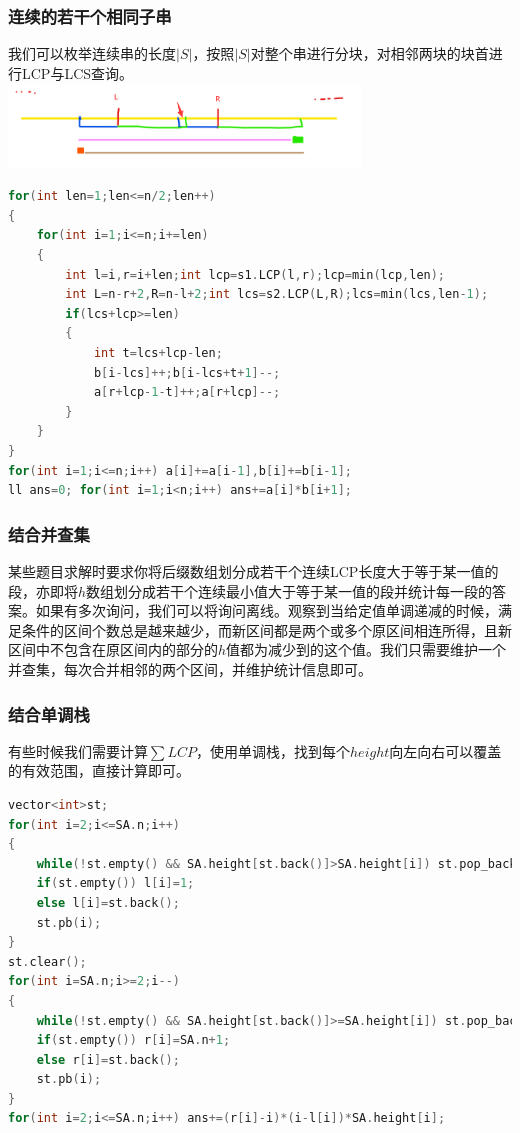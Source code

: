 \documentclass[a4paper]{book}
\begin{document}
\subsubsection{连续的若干个相同子串}
我们可以枚举连续串的长度$|S|$，按照$|S|$对整个串进行分块，对相邻两块的块首进行LCP与LCS查询。\\
\includegraphics[width=0.7\textwidth,center]{../photo/sa3}\\
\begin{lstlisting}[language=c++,title=字符串多少子串可写成AABB形式]
for(int len=1;len<=n/2;len++)
{
    for(int i=1;i<=n;i+=len)
    {
        int l=i,r=i+len;int lcp=s1.LCP(l,r);lcp=min(lcp,len);
        int L=n-r+2,R=n-l+2;int lcs=s2.LCP(L,R);lcs=min(lcs,len-1);
        if(lcs+lcp>=len)
        {
            int t=lcs+lcp-len;
            b[i-lcs]++;b[i-lcs+t+1]--;
            a[r+lcp-1-t]++;a[r+lcp]--;
        }
    }
}
for(int i=1;i<=n;i++) a[i]+=a[i-1],b[i]+=b[i-1];
ll ans=0; for(int i=1;i<n;i++) ans+=a[i]*b[i+1];
\end{lstlisting}
\subsubsection{结合并查集}
某些题目求解时要求你将后缀数组划分成若干个连续LCP长度大于等于某一值的段，亦即将$h$数组划分成若干个连续最小值大于等于某一值的段并统计每一段的答案。如果有多次询问，我们可以将询问离线。观察到当给定值单调递减的时候，满足条件的区间个数总是越来越少，而新区间都是两个或多个原区间相连所得，且新区间中不包含在原区间内的部分的$h$值都为减少到的这个值。我们只需要维护一个并查集，每次合并相邻的两个区间，并维护统计信息即可。
\subsubsection{结合单调栈}
有些时候我们需要计算$\sum LCP$，使用单调栈，找到每个$height$向左向右可以覆盖的有效范围，直接计算即可。
\begin{lstlisting}[language=c++]
vector<int>st;
for(int i=2;i<=SA.n;i++)
{
    while(!st.empty() && SA.height[st.back()]>SA.height[i]) st.pop_back();
    if(st.empty()) l[i]=1;
    else l[i]=st.back();
    st.pb(i);
}
st.clear();
for(int i=SA.n;i>=2;i--)
{
    while(!st.empty() && SA.height[st.back()]>=SA.height[i]) st.pop_back();
    if(st.empty()) r[i]=SA.n+1;
    else r[i]=st.back();
    st.pb(i);
}
for(int i=2;i<=SA.n;i++) ans+=(r[i]-i)*(i-l[i])*SA.height[i];
\end{lstlisting}
\end{document}
